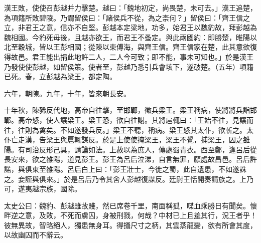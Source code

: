 \begin{pinyinscope}
漢王敗，使使召彭越并力擊楚。越曰：「魏地初定，尚畏楚，未可去。」漢王追楚，為項籍所敗碧陵。乃謂留侯曰：「諸侯兵不從，為之柰何？」留侯曰：「齊王信之立，非君王之意，信亦不自堅。彭越本定梁地，功多，始君王以魏豹故，拜彭越為魏相國。今豹死毋後，且越亦欲王，而君王不蚤定。與此兩國約：即勝楚，睢陽以北至穀城，皆以王彭相國；從陳以東傅海，與齊王信。齊王信家在楚，此其意欲復得故邑。君王能出捐此地許二人，二人今可致；即不能，事未可知也。」於是漢王乃發使使彭越，如留侯策。使者至，彭越乃悉引兵會垓下，遂破楚。（五年）項籍已死。春，立彭越為梁王，都定陶。

六年，朝陳。九年，十年，皆來朝長安。

十年秋，陳豨反代地，高帝自往擊，至邯鄲，徵兵梁王。梁王稱病，使將將兵詣邯鄲。高帝怒，使人讓梁王。梁王恐，欲自往謝。其將扈輒曰：「王始不往，見讓而往，往則為禽矣。不如遂發兵反。」梁王不聽，稱病。梁王怒其太仆，欲斬之。太仆亡走漢，告梁王與扈輒謀反。於是上使使掩梁王，梁王不覺，捕梁王，囚之雒陽。有司治反形己具，請論如法。上赦以為庶人，傳處蜀青衣。西至鄭，逢呂后從長安來，欲之雒陽，道見彭王。彭王為呂后泣涕，自言無罪，願處故昌邑。呂后許諾，與俱東至雒陽。呂后白上曰：「彭王壯士，今徙之蜀，此自遺患，不如遂誅之。妾謹與俱來。」於是呂后乃令其舍人彭越復謀反。廷尉王恬開奏請族之。上乃可，遂夷越宗族，國除。

太史公曰：魏豹、彭越雖故賤，然已席卷千里，南面稱孤，喋血乘勝日有聞矣。懷畔逆之意，及敗，不死而虜囚，身被刑戮，何哉？中材已上且羞其行，況王者乎！彼無異故，智略絕人，獨患無身耳。得攝尺寸之柄，其雲蒸龍變，欲有所會其度，以故幽囚而不辭云。


\end{pinyinscope}